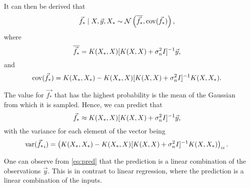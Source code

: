 \documentclass{article}
\newcommand\cN{\mathcal{N}}
\newcommand\cov{\mathrm{cov}}
\newcommand\var{\mathrm{var}}
\begin{document}
It can then be derived that \[
    \vec{f_*} \mid X, \vec{y}, X_* \sim \cN\left(\overline{\vec{f_*}}, \cov(\vec{f_*})\right)\text,
\] where \[
    \overline{\vec{f_*}} = K(X_*, X)[K(X, X) + \sigma_n^2I]^{-1}\vec{y}\text,
\] and \[
    \cov(\vec{f_*}) = K(X_*, X_*) - K(X_*, X)[K(X, X) + \sigma_n^2I]^{-1}K(X, X_*)\text.
\]

The value for $\vec{f_*}$ that has the highest probability is the mean of the Gaussian from which it is sampled. Hence, we can predict that \begin{equation}
    \label{eq:pred}
    \vec{f_*} \approx K(X_*, X)[K(X, X) + \sigma_n^2I]^{-1}\vec{y}\text,
\end{equation} with the variance for each element of the vector being\[
    \var(\vec{f_*}_i) = \left( K(X_*, X_*) - K(X_*, X)[K(X, X) + \sigma_n^2I]^{-1}K(X, X_*) \right)_{ii}\text.
\]

One can observe from \cref{eq:pred} that the prediction is a linear combination of the observations $\vec{y}$. This is in contrast to linear regression, where the prediction is a linear combination of the inputs.
\end{document}
